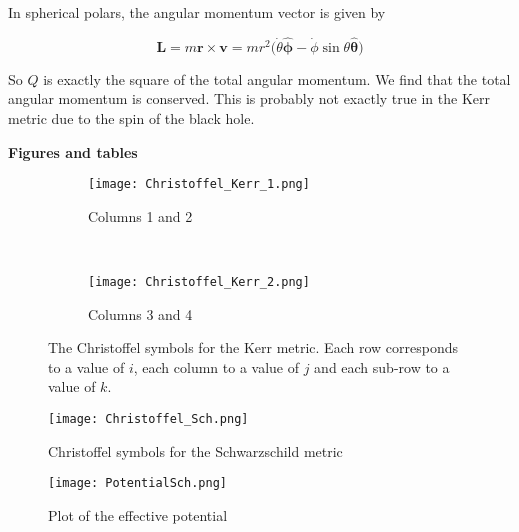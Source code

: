 \documentclass[12pt]{extarticle}
\begin{document}
In spherical polars, the angular momentum vector is given by

$$\textbf{L} = m\textbf{r}\times\textbf{v} = mr^2(\dot{\theta}\bm{\hat{\phi}}-\dot{\phi}\sin\theta \bm{\hat{\theta})}$$

So $Q$ is exactly the square of the total angular momentum. We find that the total angular momentum is conserved. This is probably not exactly true in the Kerr metric due to the spin of the black hole. 

\pagebreak
\begin{center}
\textbf{Figures and tables}
\end{center}

\begin{figure}[bh!]
    \centering
    \begin{subfigure}[b]{0.85\textwidth}
        \texttt{[image: Christoffel\_Kerr\_1.png]}
        \caption{Columns 1 and 2}
        \label{figure:1a}
    \end{subfigure}  
    \\
    \begin{subfigure}[b]{0.85\textwidth}
        \texttt{[image: Christoffel\_Kerr\_2.png]}
        \caption{Columns 3 and 4}
        \label{figure:1b}
    \end{subfigure} 
    \caption{The Christoffel symbols for the Kerr metric. Each row corresponds to a value of $i$, each column to a value of $j$ and each sub-row to a value of $k$.}
    \label{figure 1}
\end{figure}

\begin{figure}[h]
\centering
\texttt{[image: Christoffel\_Sch.png]}\\
\caption{Christoffel symbols for the Schwarzschild metric}
\label{figure:2}
\end{figure}

\begin{figure}[h]
\centering
\texttt{[image: PotentialSch.png]}\\
\caption{Plot of the effective potential}
\label{figure:3}
\end{figure}
\end{document}

